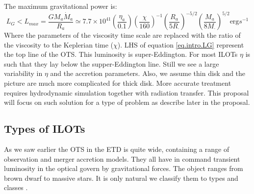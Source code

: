 \documentclass[a4paper,12pt,modern]{aastex62}
\begin{document}
The maximum gravitational power is:
\begin{equation}\label{eq.intro.LG}
L_G<L_{max} = \frac{GM_a\dot M_a}{R_a} \simeq 7.7 \times 10^{41}\left(\frac{\eta_a}{0.1}\right) \left(\frac{\chi}{160}\right)^{-1} \left(\frac{R_a}{5 R_\cdot}\right)^{-5/2} \left( \frac{M_a}{8 M_\cdot}\right)^{5/2} \text{erg} s^{-1}
\end{equation}
Where the parameters of the viscosity time scale are replaced with the ratio of the viscosity to the Keplerian time ($\chi$). LHS of equation \ref{eq.intro.LG} represent the top line of the OTS. This luminosity is super-Eddington. For most ILOTs $\eta$ is such that they lay below the supper-Eddington line. Still we see a large variability in $\eta$ and the accretion parameters. Also, we assume thin disk and the picture are much more complicated for thick disk. More accurate treatment requires hydrodynamic simulation together with radiation transfer. This proposal will focus on such solution for a type of problem as describe later in the proposal.

\subsection{Types of ILOTs \label{subsec:Types of ILOTs}}
As we saw earlier the OTS in the ETD is quite wide, containing a range of observation and merger accretion models. They all have in command transient luminosity in the optical govern by gravitational forces. The object ranges from brown dwarf to massive stars. It is only natural we classify them to types and classes \cite{2016RAA....16...99K,2018Galax...6...82K}.
\end{document}
